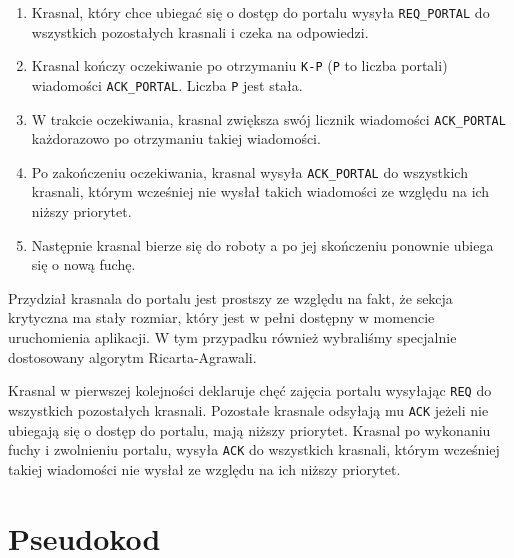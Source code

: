 \documentclass{article}
\begin{document}
    \begin{enumerate}
        \item Krasnal, który chce ubiegać się o dostęp do portalu wysyła \texttt{REQ\_PORTAL} do wszystkich pozostałych krasnali i czeka na odpowiedzi.
        \item Krasnal kończy oczekiwanie po otrzymaniu \texttt{K-P} (\texttt{P} to liczba portali) wiadomości \texttt{ACK\_PORTAL}. Liczba \texttt{P} jest stała.
        \item W trakcie oczekiwania, krasnal zwiększa swój licznik wiadomości \texttt{ACK\_PORTAL} każdorazowo po otrzymaniu takiej wiadomości.
        \item Po zakończeniu oczekiwania, krasnal wysyła \texttt{ACK\_PORTAL} do wszystkich krasnali, którym wcześniej nie wysłał takich wiadomości ze względu na ich niższy priorytet.
        \item Następnie krasnal bierze się do roboty a po jej skończeniu ponownie ubiega się o nową fuchę.
    \end{enumerate}

    Przydział krasnala do portalu jest prostszy ze względu na fakt, że sekcja krytyczna ma stały rozmiar, który jest w pełni dostępny w momencie uruchomienia aplikacji.
    W tym przypadku również wybraliśmy specjalnie dostosowany algorytm Ricarta-Agrawali.

    Krasnal w pierwszej kolejności deklaruje chęć zajęcia portalu wysyłając \texttt{REQ} do wszystkich pozostałych krasnali.
    Pozostałe krasnale odsyłają mu \texttt{ACK} jeżeli nie ubiegają się o dostęp do portalu, mają niższy priorytet.
    Krasnal po wykonaniu fuchy i zwolnieniu portalu, wysyła \texttt{ACK} do wszystkich krasnali, którym wcześniej takiej wiadomości nie wysłał ze względu na ich niższy priorytet.

    \newpage

    \section{Pseudokod}
\end{document}
